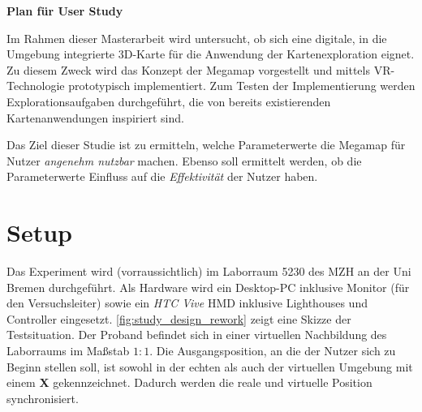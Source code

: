 \documentclass[
    draft=false,
    paper=a4,
    fontsize=12pt,
    twoside=false,
    captions=tableheading,
    british, ngerman,
]{scrartcl}
\begin{document}
\begin{center}
    \LARGE\textsf{\textbf{Plan für User Study}}
\end{center}

\noindent
Im Rahmen dieser Masterarbeit wird untersucht, ob sich eine digitale, in die Umgebung integrierte 3D-Karte für die Anwendung der Kartenexploration eignet.
Zu diesem Zweck wird das Konzept der Megamap vorgestellt und mittels VR-Technologie prototypisch implementiert.
Zum Testen der Implementierung werden Explorationsaufgaben durchgeführt, die von bereits existierenden Kartenanwendungen inspiriert sind.

Das Ziel dieser Studie ist zu ermitteln, welche Parameterwerte die Megamap für Nutzer \emph{angenehm nutzbar} machen.
Ebenso soll ermittelt werden, ob die Parameterwerte Einfluss auf die \emph{Effektivität} der Nutzer haben.

\section{Setup}
Das Experiment wird (vorraussichtlich) im Laborraum 5230 des MZH an der Uni Bremen durchgeführt.
Als Hardware wird ein Desktop-PC inklusive Monitor (für den Versuchsleiter) sowie ein \emph{HTC Vive} HMD inklusive Lighthouses und Controller eingesetzt.
\autoref{fig:study_design_rework} zeigt eine Skizze der Testsituation.
Der Proband befindet sich in einer virtuellen Nachbildung des Laborraums im Maßstab $1:1$.
Die Ausgangsposition, an die der Nutzer sich zu Beginn stellen soll, ist sowohl in der echten als auch der virtuellen Umgebung mit einem \textbf{X} gekennzeichnet.
Dadurch werden die reale und virtuelle Position synchronisiert.
\end{document}
